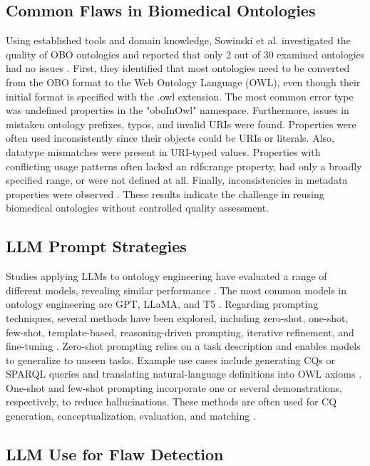 \documentclass[
]{ceurart}
\begin{document}
\subsection{Common Flaws in Biomedical Ontologies}

Using established tools and domain knowledge, Sowinski et al. investigated the quality of OBO ontologies and reported that only 2 out of 30 examined ontologies had no issues \cite{Sowiski2022}. First, they identified that most ontologies need to be converted from the OBO format to the Web Ontology Language (OWL), even though their initial format is specified with the .owl extension. The most common error type was undefined properties in the "oboInOwl" namespace. Furthermore, issues in mistaken ontology prefixes, typos, and invalid URIs were found. Properties were often used inconsistently since their objects could be URIs or literals. Also, datatype mismatches were present in URI-typed values. Properties with conflicting usage patterns often lacked an rdfs:range property, had only a broadly specified range, or were not defined at all. Finally, inconsistencies in metadata properties were observed \cite{Sowiski2022}. These results indicate the challenge in reusing biomedical ontologies without controlled quality assessment. 

\subsection{LLM Prompt Strategies}

Studies applying LLMs to ontology engineering have evaluated a range of different models, revealing similar performance \cite{li2025large,Lippolis2025}. The most common models in ontology engineering are GPT, LLaMA, and T5 \cite{li2025large}. Regarding prompting techniques, several methods have been explored, including zero-shot, one-shot, few-shot, template-based, reasoning-driven prompting, iterative refinement, and fine-tuning \cite{li2025large}. Zero-shot prompting relies on a task description and enables models to generalize to unseen tasks. Example use cases include generating CQs or SPARQL queries and translating natural-language definitions into OWL axioms \cite{li2025large}. One-shot and few-shot prompting incorporate one or several demonstrations, respectively, to reduce hallucinations. These methods are often used for CQ generation, conceptualization, evaluation, and matching \cite{li2025large,Tsaneva2024}.


\subsection{LLM Use for Flaw Detection}
\end{document}
